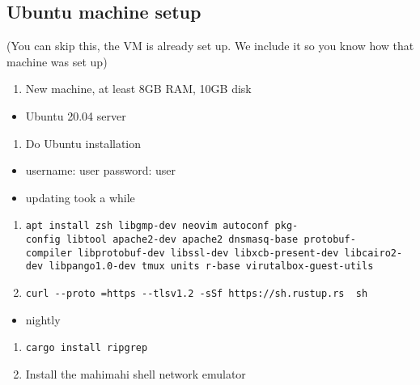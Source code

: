 \hypertarget{ubuntu-machine-setup}{%
\subsection{Ubuntu machine setup}\label{ubuntu-machine-setup}}

(You can skip this, the VM is already set up. We include it so you know
how that machine was set up)

\begin{enumerate}
\def\labelenumi{\arabic{enumi}.}
\tightlist
\item
  New machine, at least 8GB RAM, 10GB disk
\end{enumerate}

\begin{itemize}
\tightlist
\item
  Ubuntu 20.04 server
\end{itemize}

\begin{enumerate}
\def\labelenumi{\arabic{enumi}.}
\setcounter{enumi}{1}
\tightlist
\item
  Do Ubuntu installation
\end{enumerate}

\begin{itemize}
\tightlist
\item
  username: user password: user
\item
  updating took a while
\end{itemize}

\begin{enumerate}
\def\labelenumi{\arabic{enumi}.}
\setcounter{enumi}{2}
\tightlist
\item
  \texttt{apt\ install\ zsh\ libgmp-dev\ neovim\ autoconf\ pkg-config\ libtool\ apache2-dev\ apache2\ dnsmasq-base\ protobuf-compiler\ libprotobuf-dev\ libssl-dev\ libxcb-present-dev\ libcairo2-dev\ libpango1.0-dev\ tmux\ units\ r-base\ virutalbox-guest-utils}
\item
  \texttt{curl\ -\/-proto\ \textquotesingle{}=https\textquotesingle{}\ -\/-tlsv1.2\ -sSf\ https://sh.rustup.rs\ \textbar{}\ sh}
\end{enumerate}

\begin{itemize}
\tightlist
\item
  nightly
\end{itemize}

\begin{enumerate}
\def\labelenumi{\arabic{enumi}.}
\setcounter{enumi}{4}
\tightlist
\item
  \texttt{cargo\ install\ ripgrep}
\item
  Install the mahimahi shell network emulator
\end{enumerate}

